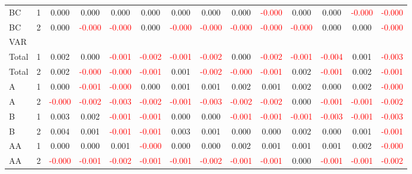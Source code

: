 \begin{table}[!htb]
{\begin{tabular}{llcccccccccccc}
BC & 1 & 0.000 & 0.000 & 0.000 & 0.000 & 0.000 & 0.000 & 0.000 & \textcolor{red}{-0.000} & 0.000 & 0.000 & \textcolor{red}{-0.000} & \textcolor{red}{-0.000}\\
BC & 2 & 0.000 & \textcolor{red}{-0.000} & \textcolor{red}{-0.000} & 0.000 & \textcolor{red}{-0.000} & \textcolor{red}{-0.000} & \textcolor{red}{-0.000} & \textcolor{red}{-0.000} & \textcolor{red}{-0.000} & 0.000 & 0.000 & \textcolor{red}{-0.000}\\
\hline
VAR &  &  &  &  &  &  &  &  &  &  &  &  & \\
\hline
Total & 1 & 0.002 & 0.000 & \textcolor{red}{-0.001} & \textcolor{red}{-0.002} & \textcolor{red}{-0.001} & \textcolor{red}{-0.002} & 0.000 & \textcolor{red}{-0.002} & \textcolor{red}{-0.001} & \textcolor{red}{-0.004} & 0.001 & \textcolor{red}{-0.003}\\
Total & 2 & 0.002 & \textcolor{red}{-0.000} & \textcolor{red}{-0.000} & \textcolor{red}{-0.001} & 0.001 & \textcolor{red}{-0.002} & \textcolor{red}{-0.000} & \textcolor{red}{-0.001} & 0.002 & \textcolor{red}{-0.001} & 0.002 & \textcolor{red}{-0.001}\\
A & 1 & 0.000 & \textcolor{red}{-0.001} & \textcolor{red}{-0.000} & 0.000 & 0.001 & 0.001 & 0.002 & 0.001 & 0.002 & 0.000 & 0.002 & \textcolor{red}{-0.000}\\
A & 2 & \textcolor{red}{-0.000} & \textcolor{red}{-0.002} & \textcolor{red}{-0.003} & \textcolor{red}{-0.002} & \textcolor{red}{-0.001} & \textcolor{red}{-0.003} & \textcolor{red}{-0.002} & \textcolor{red}{-0.002} & 0.000 & \textcolor{red}{-0.001} & \textcolor{red}{-0.001} & \textcolor{red}{-0.002}\\
B & 1 & 0.003 & 0.002 & \textcolor{red}{-0.001} & \textcolor{red}{-0.001} & 0.000 & 0.000 & \textcolor{red}{-0.001} & \textcolor{red}{-0.001} & \textcolor{red}{-0.001} & \textcolor{red}{-0.003} & \textcolor{red}{-0.001} & \textcolor{red}{-0.003}\\
B & 2 & 0.004 & 0.001 & \textcolor{red}{-0.001} & \textcolor{red}{-0.001} & 0.003 & 0.001 & 0.000 & 0.000 & 0.002 & 0.000 & 0.001 & \textcolor{red}{-0.001}\\
AA & 1 & 0.000 & 0.000 & 0.001 & \textcolor{red}{-0.000} & 0.000 & 0.000 & 0.002 & 0.001 & 0.001 & 0.001 & 0.002 & \textcolor{red}{-0.000}\\
AA & 2 & \textcolor{red}{-0.000} & \textcolor{red}{-0.001} & \textcolor{red}{-0.002} & \textcolor{red}{-0.001} & \textcolor{red}{-0.001} & \textcolor{red}{-0.002} & \textcolor{red}{-0.001} & \textcolor{red}{-0.001} & 0.000 & \textcolor{red}{-0.001} & \textcolor{red}{-0.001} & \textcolor{red}{-0.002}\\

\end{tabular}}
\end{table}
